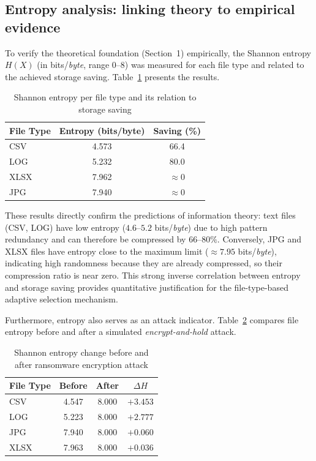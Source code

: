 \documentclass{iaesarticle}
\begin{document}
\subsection{Entropy analysis: linking theory to empirical evidence}
To verify the theoretical foundation (Section~1) empirically, the Shannon entropy $H(X)$ (in bits/\textit{byte}, range 0--8) was measured for each file type and related to the achieved storage saving. Table~\ref{tab:entropy_type} presents the results.

\begin{table}[H]
\centering
\fontsize{8pt}{10pt}\selectfont
\caption{Shannon entropy per file type and its relation to storage saving}
\label{tab:entropy_type}
\begin{tabular}{l c c}
\hline
\textbf{File Type} & \textbf{Entropy (bits/byte)} & \textbf{Saving (\%)} \\
\hline
CSV  & 4.573 & 66.4 \\
LOG  & 5.232 & 80.0 \\
XLSX & 7.962 & $\approx$0 \\
JPG  & 7.940 & $\approx$0 \\
\hline
\end{tabular}
\end{table}

These results directly confirm the predictions of information theory: text files (CSV, LOG) have low entropy ($4.6$--$5.2$ bits/\textit{byte}) due to high pattern redundancy and can therefore be compressed by $66$--$80\%$. Conversely, JPG and XLSX files have entropy close to the maximum limit ($\approx 7.95$ bits/\textit{byte}), indicating high randomness because they are already compressed, so their compression ratio is near zero. This strong inverse correlation between entropy and storage saving provides quantitative justification for the file-type-based adaptive selection mechanism.

Furthermore, entropy also serves as an attack indicator. Table~\ref{tab:entropy_attack} compares file entropy before and after a simulated \textit{encrypt-and-hold} attack.

\begin{table}[H]
\centering
\fontsize{8pt}{10pt}\selectfont
\caption{Shannon entropy change before and after ransomware encryption attack}
\label{tab:entropy_attack}
\begin{tabular}{l c c c}
\hline
\textbf{File Type} & \textbf{Before} & \textbf{After} & \textbf{$\Delta H$} \\
\hline
CSV  & 4.547 & 8.000 & $+3.453$ \\
LOG  & 5.223 & 8.000 & $+2.777$ \\
JPG  & 7.940 & 8.000 & $+0.060$ \\
XLSX & 7.963 & 8.000 & $+0.036$ \\
\hline
\end{tabular}
\end{table}
\end{document}

